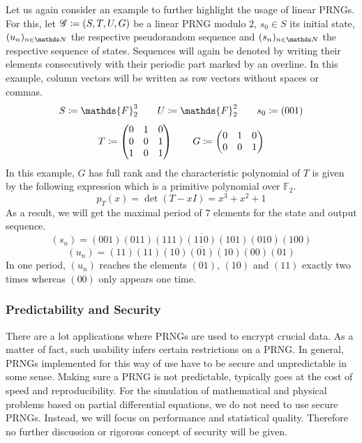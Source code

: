\documentclass{stdlocal}
\begin{document}
  \noindent
  Let us again consider an example to further highlight the usage of linear PRNGs.
  For this, let $\mathscr{G}\coloneqq (S,T,U,G)$ be a linear PRNG modulo $2$, $s_0\in S$ its initial state, $(u_n)_{n\in\setNatural}$ the respective pseudorandom sequence and $(s_n)_{n\in\setNatural}$ the respective sequence of states.
  Sequences will again be denoted by writing their elements consecutively with their periodic part marked by an overline.
  In this example, column vectors will be written as row vectors without spaces or commas.
  \[
    S \define \mathds{F}_2^3
    \separate
    U \define \mathds{F}_2^2
    \separate
    s_0 \define (001)
  \]
  \[
    T \coloneqq
    \begin{pmatrix}
      0 & 1 & 0 \\
      0 & 0 & 1 \\
      1 & 0 & 1
    \end{pmatrix}
    \qquad
    G \coloneqq
    \begin{pmatrix}
      0 & 1 & 0 \\
      0 & 0 & 1
    \end{pmatrix}
  \]
  In this example, $G$ has full rank and the characteristic polynomial of $T$ is given by the following expression which is a primitive polynomial over $\mathds{F}_2$.
  \[
    p_T(x) = \det(T - xI) = x^3 + x^2 + 1
  \]
  As a result, we will get the maximal period of $7$ elements for the state and output sequence.
  \[
    (s_n) = \overline{(001)(011)(111)(110)(101)(010)(100)}
  \]
  \[
    (u_n) = \overline{(11)(11)(10)(01)(10)(00)(01)}
  \]
  In one period, $(u_n)$ reaches the elements $(01)$, $(10)$ and $(11)$ exactly two times whereas $(00)$ only appears one time.


  \subsubsection{Predictability and Security}
  There are a lot applications where PRNGs are used to encrypt crucial data.
  As a matter of fact, such usability infers certain restrictions on a PRNG.
  In general, PRNGs implemented for this way of use have to be secure and unpredictable in some sense.
  Making sure a PRNG is not predictable, typically goes at the cost of speed and reproducibility.
  For the simulation of mathematical and physical problems based on partial differential equations, we do not need to use secure PRNGs.
  Instead, we will focus on performance and statistical quality.
  Therefore no further discussion or rigorous concept of security will be given.
\end{document}
